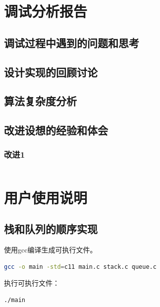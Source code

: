 \documentclass{article}
\begin{document}
\section{调试分析报告}

\subsection{调试过程中遇到的问题和思考}


\subsection{设计实现的回顾讨论}


\subsection{算法复杂度分析}


\subsection{改进设想的经验和体会}

\subsubsection{改进1}


\begin{lstlisting}[language={C},
    numbers=left,
    numberstyle=\tiny\consolas,
    basicstyle=\small\consolas]

\end{lstlisting}



\section{用户使用说明}

\subsection{栈和队列的顺序实现}

使用gcc编译生成可执行文件。

\begin{lstlisting}[language={bash},
    basicstyle=\small\consolas]
gcc -o main -std=c11 main.c stack.c queue.c
\end{lstlisting}

执行可执行文件：

\begin{lstlisting}[language={bash},
    basicstyle=\small\consolas]
./main
\end{lstlisting}
\end{document}
